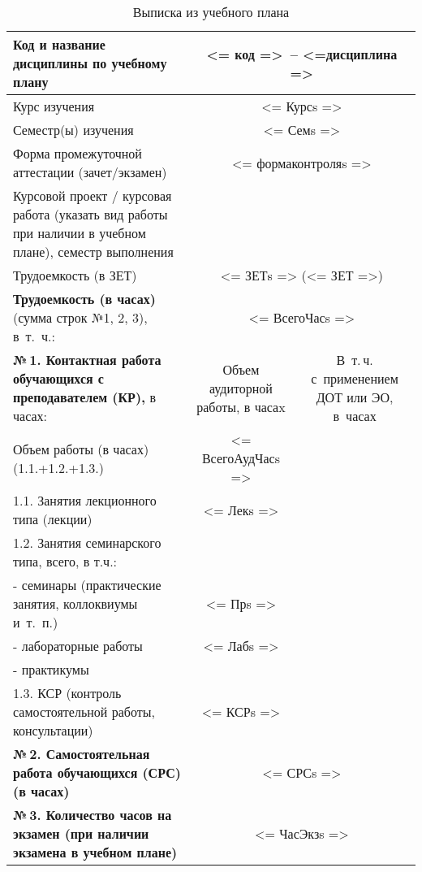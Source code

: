\documentclass[a4paper,12pt]{article}
\begin{document}
\begin{table}[H]
\caption{Выписка из учебного плана} 
\begin{tabular}{|p{9cm}|c|c|}
\hline
Код и название дисциплины по учебному плану & \multicolumn{2}{p{6cm}|}{<= код =>\ -- <=дисциплина => }\\
\hline
Курс изучения &\multicolumn{2}{c|}{ <= Курсs => }\\
\hline
Семестр(ы) изучения &\multicolumn{2}{c|}{ <= Семs => }\\
\hline
Форма промежуточной аттестации (зачет/экзамен) &\multicolumn{2}{c|}{ <= формаконтроляs => }\\
\hline
Курсовой проект / курсовая работа (указать вид работы при наличии в учебном плане), семестр выполнения &\multicolumn{2}{c|}{ }\\
\hline
Трудоемкость (в ЗЕТ) &\multicolumn{2}{c|}{ <= ЗЕТs => (<= ЗЕТ =>) }\\
\hline
{\bf Трудоемкость (в часах)} (сумма строк №1, 2, 3), в~т.~ч.:& \multicolumn{2}{c|}{<= ВсегоЧасs =>}\\
\hline
\textbf{№\,1. Контактная работа обучающихся с преподавателем (КР),} в часах:
& \multicolumn{1}{p{3cm}|}{\centering Объем аудиторной работы, в часаx}
& \multicolumn{1}{p{3cm}|}{\centering\arraybackslash В~т.\,ч. с~применением ДОТ или ЭО, в~часах}\\
\hline  
Объем работы (в часах) (1.1.+1.2.+1.3.)& <= ВсегоАудЧасs => & \\
\hline
1.1. Занятия лекционного типа (лекции) & <= Лекs => & \\
\hline
1.2. Занятия семинарского типа, всего, в т.ч.: & & \\
\hline
- семинары (практические занятия, коллоквиумы и~т.~п.)  & <= Прs => & \\
\hline
- лабораторные работы& <= Лабs => & \\
\hline
- практикумы & & \\
\hline
1.3. КСР (контроль самостоятельной работы, консультации)& <= КСРs => & \\
\hline
{\bf №\,2. Самостоятельная работа обучающихся (СРС) (в часах)}& \multicolumn{2}{c|}{<= СРСs =>}\\
\hline
{\bf №\,3. Количество часов на экзамен (при наличии экзамена в учебном плане)}& \multicolumn{2}{c|}{<= ЧасЭкзs =>}\\
\hline
\end{tabular}
\end{table}
\end{document}
